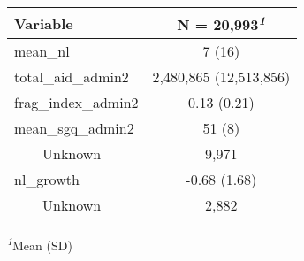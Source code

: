 \begin{table}[!t]
\fontsize{12.0pt}{14.4pt}\selectfont
\begin{tabular*}{\linewidth}{@{\extracolsep{\fill}}lc}
\toprule
\textbf{Variable} & \textbf{N = 20,993}\textsuperscript{\textit{1}} \\ 
\midrule\addlinespace[2.5pt]
mean\_nl & 7 (16) \\ 
total\_aid\_admin2 & 2,480,865 (12,513,856) \\ 
frag\_index\_admin2 & 0.13 (0.21) \\ 
mean\_sgq\_admin2 & 51 (8) \\ 
    Unknown & 9,971 \\ 
nl\_growth & -0.68 (1.68) \\ 
    Unknown & 2,882 \\ 
\bottomrule
\end{tabular*}
\begin{minipage}{\linewidth}
\textsuperscript{\textit{1}}Mean (SD)\\
\end{minipage}
\end{table}

